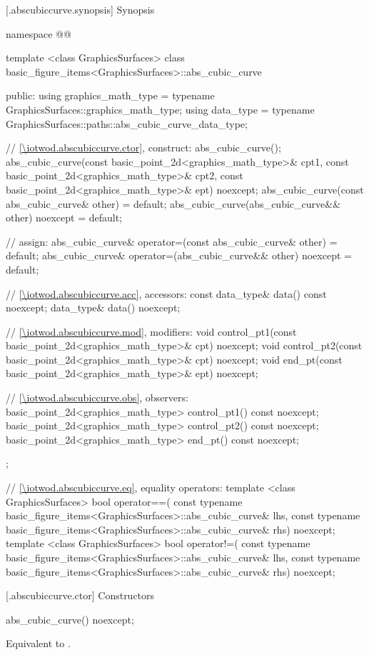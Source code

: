  [\iotwod.abscubiccurve.synopsis] {Synopsis}
\begin{codeblock}
namespace @\fullnamespace{}@ {
  template <class GraphicsSurfaces>
  class basic_figure_items<GraphicsSurfaces>::abs_cubic_curve {
  public:
    using graphics_math_type = typename GraphicsSurfaces::graphics_math_type;
    using data_type =
      typename GraphicsSurfaces::paths::abs_cubic_curve_data_type;

    // \ref{\iotwod.abscubiccurve.ctor}, construct:
    abs_cubic_curve();
    abs_cubic_curve(const basic_point_2d<graphics_math_type>& cpt1,
       const basic_point_2d<graphics_math_type>& cpt2,
       const basic_point_2d<graphics_math_type>& ept) noexcept;
    abs_cubic_curve(const abs_cubic_curve& other) = default;
    abs_cubic_curve(abs_cubic_curve&& other) noexcept = default;

    // assign:
    abs_cubic_curve& operator=(const abs_cubic_curve& other) = default;
    abs_cubic_curve& operator=(abs_cubic_curve&& other) noexcept = default;

    // \ref{\iotwod.abscubiccurve.acc}, accessors:
    const data_type& data() const noexcept;
    data_type& data() noexcept;

    // \ref{\iotwod.abscubiccurve.mod}, modifiers:
    void control_pt1(const basic_point_2d<graphics_math_type>& cpt) noexcept;
    void control_pt2(const basic_point_2d<graphics_math_type>& cpt) noexcept;
    void end_pt(const basic_point_2d<graphics_math_type>& ept) noexcept;

    // \ref{\iotwod.abscubiccurve.obs}, observers:
    basic_point_2d<graphics_math_type> control_pt1() const noexcept;
    basic_point_2d<graphics_math_type> control_pt2() const noexcept;
    basic_point_2d<graphics_math_type> end_pt() const noexcept;
  };

  // \ref{\iotwod.abscubiccurve.eq}, equality operators:
  template <class GraphicsSurfaces>
  bool operator==(
    const typename basic_figure_items<GraphicsSurfaces>::abs_cubic_curve& lhs,
    const typename basic_figure_items<GraphicsSurfaces>::abs_cubic_curve& rhs) 
    noexcept;  
  template <class GraphicsSurfaces>
  bool operator!=(
    const typename basic_figure_items<GraphicsSurfaces>::abs_cubic_curve& lhs,
    const typename basic_figure_items<GraphicsSurfaces>::abs_cubic_curve& rhs) 
    noexcept;  
}
\end{codeblock}

 [\iotwod.abscubiccurve.ctor] {Constructors}%

%
\begin{itemdecl}
abs_cubic_curve() noexcept;
\end{itemdecl}
\begin{itemdescr}
\pnum
\effects
Equivalent to .
\end{itemdescr}


